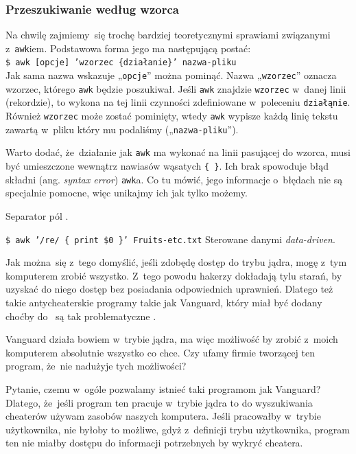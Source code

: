 \documentclass[10pt,t]{beamer}
\begin{document}
\begin{frame}
  \frametitle{Przeszukiwanie według wzorca}


  Na chwilę zajmiemy~się trochę bardziej teoretycznymi sprawiami
  związanymi z~\texttt{awk}iem. Podstawowa forma jego ma następującą
  postać: \\
  \texttt{\$ awk [opcje] 'wzorzec \{działanie\}' nazwa-pliku} \\
  Jak sama nazwa wskazuje „\texttt{opcje}” można pominąć. Nazwa
  „\texttt{wzorzec}” oznacza wzorzec, którego \texttt{awk} będzie
  poszukiwał. Jeśli \texttt{awk} znajdzie \texttt{wzorzec} w~danej linii
  (rekordzie), to wykona na tej linii czynności zdefiniowane w~poleceniu
  \texttt{działąnie}. Również \texttt{wzorzec} może zostać pominięty, wtedy
  \texttt{awk} wypisze  każdą linię tekstu zawartą w~pliku który mu
  podaliśmy („\texttt{nazwa-pliku}”).


  Warto dodać, że~działanie jak \texttt{awk} ma wykonać na linii pasującej
  do wzorca, musi być umieszczone wewnątrz nawiasów wąsatych \texttt{\{ \}}.
  Ich brak spowoduje błąd składni (ang. \textit{syntax error})
  \texttt{awk}a. Co tu mówić, jego informacje o~błędach nie są specjalnie
  pomocne, więc unikajmy ich jak tylko możemy.


  Separator pól .


  \texttt{\$ awk '/re/ \{ print \$0 \}' Fruits-etc.txt}
  Sterowane danymi \textit{data-driven}.

  Jak można~się z~tego domyślić, jeśli zdobędę dostęp do trybu jądra, mogę
  z~tym komputerem zrobić wszystko. Z~tego powodu hakerzy dokładają tylu
  starań, by uzyskać do niego dostęp \alert{bez} posiadania odpowiednich
  uprawnień. Dlatego też takie antycheaterskie programy takie jak Vanguard,
  który miał być dodany choćby do
  ~są tak problematyczne
  \parencite{Low-Level-Why-Riots-anti-cheat-is-a-HUGE-problem-Ver-2024}.

  Vanguard działa bowiem w~trybie jądra, ma więc możliwość by zrobić
  z~moich komputerem absolutnie wszystko co chce. Czy ufamy firmie
  tworzącej ten program, że~nie nadużyje tych możliwości?

  Pytanie, czemu w~ogóle pozwalamy istnieć taki programom jak Vanguard?
  Dlatego, że~jeśli program ten pracuje w~trybie jądra to do wyszukiwania
  cheaterów używam zasobów \alert{naszych} komputera. Jeśli pracowałby
  w~trybie użytkownika, nie byłoby to możliwe, gdyż z~definicji trybu
  użytkownika, program ten nie miałby dostępu do informacji potrzebnych by
  wykryć cheatera.

\end{frame}
\end{document}
